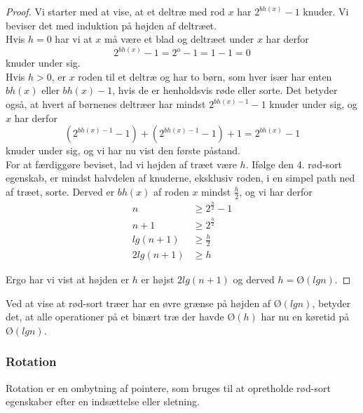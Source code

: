 \begin{proof}
  Vi starter med at vise, at et deltræ med rod $x$ har $2^{bh(x)}- 1$ knuder. Vi beviser det med induktion på højden af deltræet.\\
  Hvis $h=0$ har vi at $x$ må være et blad og deltræet under $x$ har derfor
  $$2^{bh(x)} - 1 = 2^o - 1 = 1 - 1 = 0$$
  knuder under sig.\\

  Hvis $h > 0$, er $x$ roden til et deltræ og har to børn, som hver især har enten $bh(x)$ eller $bh(x) - 1$, hvis de er henholdsvis røde eller sorte. Det betyder også, at hvert af børnenes deltræer har mindst $2^{bh(x)-1}-1$ knuder under sig, og $x$ har derfor
  $$(2^{bh(x)-1} - 1) + (2^{bh(x)-1} - 1) + 1 = 2^{bh(x)} - 1$$
  knuder under sig, og vi har nu vist den første påstand.\\

  For at færdiggøre beviset, lad vi højden af træet være $h$. Ifølge den 4. rød-sort egenskab, er mindst halvdelen af knuderne, eksklusiv roden, i en simpel path ned af træet, sorte. Derved er $bh(x)$ af roden $x$ mindst $\frac{h}{2}$, og vi har derfor
  \begin{align*}
           n &\geq 2^{\frac{h}{2}} - 1\\
       n + 1 &\geq 2^{\frac{h}{2}}\\
     lg(n+1) &\geq \frac{h}{2}\\
    2lg(n+1) &\geq h
  \end{align*}

  Ergo har vi vist at højden er $h$ er højst $2lg(n+1)$ og derved $h=Ø(lgn)$.
\end{proof}

Ved at vise at rød-sort træer har en øvre grænse på højden af $Ø(lgn)$, betyder det, at alle operationer på et binært træ der havde $Ø(h)$ har nu en køretid på $Ø(lgn)$.

\subsubsection{Rotation}
Rotation er en ombytning af pointere, som bruges til at opretholde rød-sort egenskaber efter en indsættelse eller sletning.


\begin{center}
\end{center}

